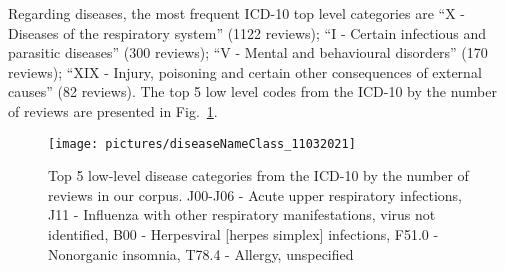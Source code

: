 \documentclass[a4paper,fleqn,longmktitle]{cas-dc}
\begin{document}
%


Regarding diseases, the most frequent ICD-10 top level categories are ``X - Diseases of the respiratory system'' (1122 reviews); ``I - Certain infectious and parasitic diseases'' (300 reviews); ``V - Mental and behavioural disorders'' (170 reviews); ``XIX - Injury, poisoning and certain other consequences of external causes'' (82 reviews). The top 5 low level codes from the ICD-10 by the number of reviews are presented in Fig.~\ref{fig:Top_5_diseases}.

\begin{figure}
    \centering
    \texttt{[image: pictures/diseaseNameClass\_11032021]}
    \caption{Top 5 low-level disease categories from the ICD-10 by the number of reviews in our corpus. J00-J06 - Acute upper respiratory infections, J11 - Influenza with other respiratory manifestations, virus not identified, B00 - Herpesviral [herpes simplex] infections, F51.0 - Nonorganic insomnia, T78.4 - Allergy, unspecified}
    \label{fig:Top_5_diseases}
\end{figure}


%
\end{document}
